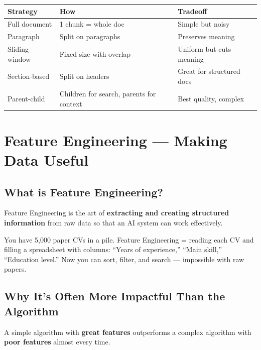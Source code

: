 \documentclass[11pt,a4paper]{report}
\begin{document}
\begin{table}[h]
\centering
\begin{tabularx}{\textwidth}{l X X}
\toprule
\textbf{Strategy} & \textbf{How} & \textbf{Tradeoff} \\
\midrule
Full document & 1 chunk = whole doc & Simple but noisy \\
Paragraph & Split on paragraphs & Preserves meaning \\
Sliding window & Fixed size with overlap & Uniform but cuts meaning \\
Section-based & Split on headers & Great for structured docs \\
Parent-child & Children for search, parents for context & Best quality, complex \\
\bottomrule
\end{tabularx}
\end{table}

\chapter{Feature Engineering --- Making Data Useful}

\section{What is Feature Engineering?}

Feature Engineering is the art of \textbf{extracting and creating structured information} from raw data so that an AI system can work effectively.

\begin{analogybox}
You have 5,000 paper CVs in a pile. Feature Engineering = reading each CV and filling a spreadsheet with columns: ``Years of experience,'' ``Main skill,'' ``Education level.'' Now you can sort, filter, and search --- impossible with raw papers.
\end{analogybox}

\section{Why It's Often More Impactful Than the Algorithm}

A simple algorithm with \textbf{great features} outperforms a complex algorithm with \textbf{poor features} almost every time.
\end{document}
